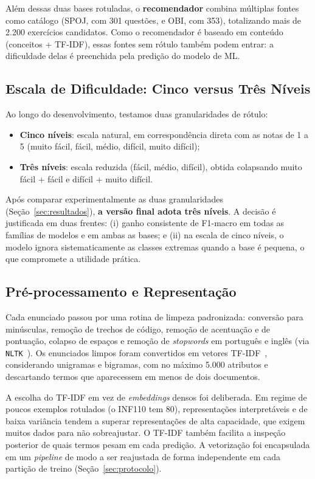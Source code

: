 \documentclass[sigconf]{webmedia}
\begin{document}
Além dessas duas bases rotuladas, o \textbf{recomendador} combina múltiplas fontes como catálogo (SPOJ, com 301 questões, e OBI, com 353), totalizando mais de 2.200 exercícios candidatos. Como o recomendador é baseado em conteúdo (conceitos + TF-IDF), essas fontes sem rótulo também podem entrar: a dificuldade delas é preenchida pela predição do modelo de ML.

\subsection{Escala de Dificuldade: Cinco versus Três Níveis}
\label{sec:escala}

Ao longo do desenvolvimento, testamos duas granularidades de rótulo:
\begin{itemize}
  \item \textbf{Cinco níveis}: escala natural, em correspondência direta com as notas de 1 a 5 (muito fácil, fácil, médio, difícil, muito difícil);
  \item \textbf{Três níveis}: escala reduzida (fácil, médio, difícil), obtida colapsando muito fácil + fácil e difícil + muito difícil.
\end{itemize}

Após comparar experimentalmente as duas granularidades (Seção~\ref{sec:resultados}), \textbf{a versão final adota três níveis}. A decisão é justificada em duas frentes: (i) ganho consistente de F1-macro em todas as famílias de modelos e em ambas as bases; e (ii) na escala de cinco níveis, o modelo ignora sistematicamente as classes extremas quando a base é pequena, o que compromete a utilidade prática.

\subsection{Pré-processamento e Representação}

Cada enunciado passou por uma rotina de limpeza padronizada: conversão para minúsculas, remoção de trechos de código, remoção de acentuação e de pontuação, colapso de espaços e remoção de \textit{stopwords} em português e inglês (via \texttt{NLTK}~\cite{bird2009}). Os enunciados limpos foram convertidos em vetores TF-IDF~\cite{salton1988}, considerando unigramas e bigramas, com no máximo 5.000 atributos e descartando termos que aparecessem em menos de dois documentos.

A escolha do TF-IDF em vez de \textit{embeddings} densos foi deliberada. Em regime de poucos exemplos rotulados (o INF110 tem 80), representações interpretáveis e de baixa variância tendem a superar representações de alta capacidade, que exigem muitos dados para não sobreajustar. O TF-IDF também facilita a inspeção posterior de quais termos pesam em cada predição. A vetorização foi encapsulada em um \textit{pipeline} de modo a ser reajustada de forma independente em cada partição de treino (Seção~\ref{sec:protocolo}).
\end{document}
